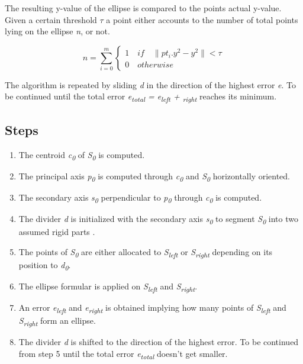 The resulting y-value of the ellipse is compared to the points actual y-value. Given a certain threshold $\tau$ a point either accounts to the number of total points lying on the ellipse \textit{n}, or not.

\begin{equation}
n = \sum_{i=0}^{m}\begin{cases}1 \quad if \quad \|pt_i.y^2 - y^2 \| < \tau \\ 0 \quad otherwise\end{cases}
\end{equation}

The algorithm is repeated by sliding \textit{d} in the direction of the highest error \textit{e}. To be continued until the total error \textit{e\textsubscript{total} = e\textsubscript{left} + \textsubscript{right}} reaches its minimum.

\subsection{Steps}

\begin{enumerate}
	\item The centroid \textit{c\textsubscript{0}}  of \textit{S\textsubscript{0}} is computed.
	
	\item The principal axis \textit{p\textsubscript{0}} is computed through \textit{c\textsubscript{0}} and \textit{S\textsubscript{0}} horizontally oriented. 
	
	\item The secondary axis \textit{s\textsubscript{0}}  perpendicular to \textit{p\textsubscript{0}} through \textit{c\textsubscript{0}} is computed.
	
	\item The divider \textit{d} is initialized with the secondary axis \textit{s\textsubscript{0}} to segment \textit{S\textsubscript{0}} into two assumed rigid parts .
	
	\item The points of \textit{S\textsubscript{0}} are either allocated to \textit{S\textsubscript{left}} or \textit{S\textsubscript{right}} depending on its position to \textit{d\textsubscript{0}}.
	
	\item The ellipse formular is applied on \textit{S\textsubscript{left}} and \textit{S\textsubscript{right}}.
	
	\item An error \textit{e\textsubscript{left}} and \textit{e\textsubscript{right}} is obtained implying how many points of \textit{S\textsubscript{left}} and \textit{S\textsubscript{right}} form an ellipse. 
	
	\item The divider \textit{d} is shifted to the direction of the highest error. To be continued from step 5 until the total error \textit{e\textsubscript{total}} doesn't get smaller. 
\end{enumerate}

